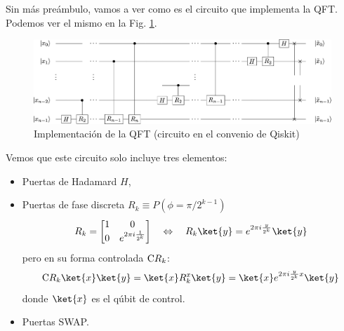 \documentclass[a4paper,11pt]{book} %
\numberwithin{equation}{chapter}
\newcommand{\cg}[1]{{\rm C}#1}
\begin{document}
Sin más preámbulo, vamos a ver como es el circuito que implementa la QFT. Podemos ver el mismo en la Fig. \ref{Fig_QFT_circuit}.

	\begin{figure}[H]
	\centering 
	\includegraphics[width=1\linewidth]{Figuras/Fig_QFT_circuit.png}
	\caption{Implementación de la QFT (circuito en el convenio de Qiskit)}
	\label{Fig_QFT_circuit}
	\end{figure}

Vemos que este circuito solo incluye tres elementos:
\begin{itemize}
	\item Puertas de Hadamard $H$,
	\item Puertas de fase discreta $R_k \equiv P (\phi = \pi/2^{k-1})$
		\begin{equation}
		R_k = \begin{bmatrix}
		1 & 0 \\ 0 & e^{2 \pi i \frac{1}{2^k}}
		\end{bmatrix} \quad \Leftrightarrow \quad R_k \ket{y} = e^{2 \pi i \frac{y}{2^k}} \ket{y}
		\end{equation}
		pero en su forma controlada $\cg{R_k}$:
			\begin{equation} \label{ec_QFT_CRk}
			\cg{R_k}\ket{x}\ket{y} = \ket{x}R^{x}_{k}\ket{y}  = \ket{x}  e^{2 \pi i   \frac{y}{2^{k}}x}\ket{y}
			\end{equation}
		donde $\ket{x}$ es el qúbit de control.
	\item Puertas SWAP.
\end{itemize}
\end{document}

